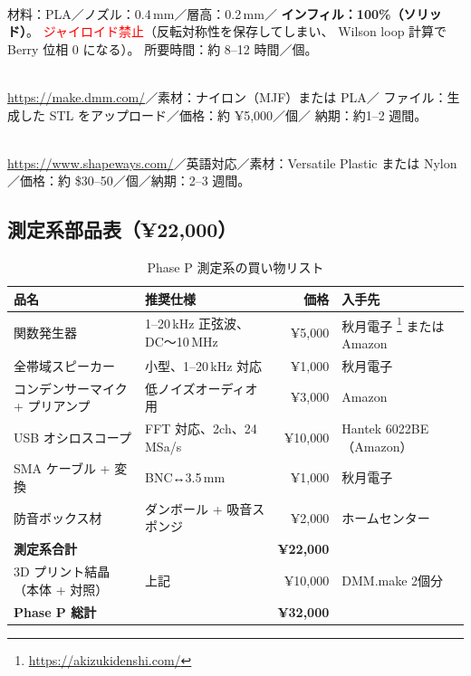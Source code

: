\documentclass[11pt,a4paper]{article}
\begin{document}
\begin{description}[leftmargin=2em]
  \item[オプション A：自前の Bambu Lab P1S（所有していれば）] \hfill \\
    材料：PLA／ノズル：0.4\,mm／層高：0.2\,mm／
    \textbf{インフィル：100\%（ソリッド）}。
    \textcolor{red}{ジャイロイド禁止}（反転対称性を保存してしまい、
    Wilson loop 計算で Berry 位相 0 になる）。
    所要時間：約 8--12 時間／個。
  \item[オプション B：DMM.make 3Dプリント外注] \hfill \\
    \url{https://make.dmm.com/}／素材：ナイロン（MJF）または PLA／
    ファイル：生成した STL をアップロード／価格：約 ¥5,000／個／
    納期：約1--2 週間。
  \item[オプション C：Shapeways（海外）] \hfill \\
    \url{https://www.shapeways.com/}／英語対応／素材：Versatile Plastic
    または Nylon／価格：約 \$30--50／個／納期：2--3 週間。
\end{description}

\subsection{測定系部品表（¥22,000）}

\begin{table}[h]
\centering
\caption{Phase P 測定系の買い物リスト}
\label{tab:phase_p_parts}
\small
\begin{tabular}{llrl}
\toprule
品名 & 推奨仕様 & 価格 & 入手先 \\
\midrule
関数発生器 & 1--20\,kHz 正弦波、DC〜10\,MHz & ¥5,000 & 秋月電子
\footnote{\url{https://akizukidenshi.com/}} または Amazon \\
全帯域スピーカー & 小型、1--20\,kHz 対応 & ¥1,000 & 秋月電子 \\
コンデンサーマイク + プリアンプ & 低ノイズオーディオ用 & ¥3,000 & Amazon \\
USB オシロスコープ & FFT 対応、2ch、24\,MSa/s & ¥10,000 &
Hantek 6022BE（Amazon） \\
SMA ケーブル + 変換 & BNC↔3.5\,mm & ¥1,000 & 秋月電子 \\
防音ボックス材 & ダンボール + 吸音スポンジ & ¥2,000 & ホームセンター \\
\midrule
\textbf{測定系合計} & & \textbf{¥22,000} & \\
\midrule
3D プリント結晶（本体 + 対照） & 上記 & ¥10,000 & DMM.make 2個分 \\
\midrule
\textbf{Phase P 総計} & & \textbf{¥32,000} & \\
\bottomrule
\end{tabular}
\end{table}
\end{document}
